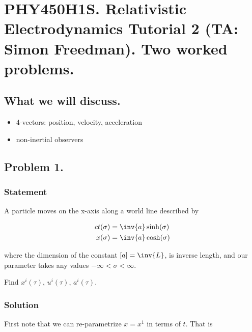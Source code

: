 
%

\chapter{PHY450H1S.  Relativistic Electrodynamics Tutorial 2 (TA: Simon Freedman).  Two worked problems.}
\label{chap:relativisticElectrodynamicsT2}
{}
\date{Jan 27, 2011}

\beginArtWithToc

\section{What we will discuss.}

\begin{itemize}
\item 4-vectors: position, velocity, acceleration
\item non-inertial observers
\end{itemize}

\section{Problem 1.}

\subsection{Statement}
A particle moves on the x-axis along a world line described by

\begin{align}\label{eqn:relativisticElectrodynamicsT2:10}
ct(\sigma) &= \inv{a} \sinh(\sigma) \\
x(\sigma) &= \inv{a} \cosh(\sigma)
\end{align}

where the dimension of the constant $[a] = \inv{L}$, is inverse length, and our parameter takes any values $-\infty < \sigma < \infty$.

Find $x^i(\tau)$, $u^i(\tau)$, $a^i(\tau)$.

\subsection{Solution}

First note that we can re-parametrize $x = x^1$ in terms of $t$.  That is

